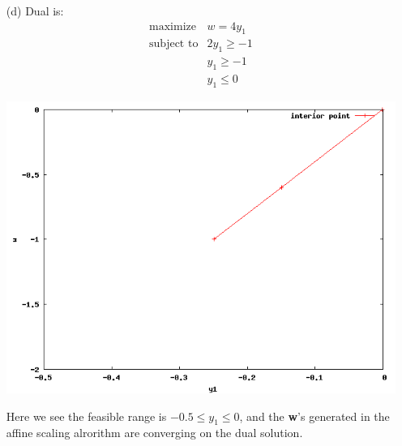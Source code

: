 \documentclass{article}
\begin{document}
\begin{enumerate}
\begin{itemize}
			\item [(d)] Dual is: \\
				\begin{displaymath}
					\begin{array}{ll}
					\textrm{maximize} & w = 4y_1 \\
					\textrm{subject to} & 2y_1 \ge -1 \\
					& y_1 \ge -1 \\
					& y_1 \le 0
					\end{array}
				\end{displaymath}

				\includegraphics[width=0.7\linewidth]{1d.png}

				Here we see the feasible range is $-0.5 \le y_1 \le 0$, and the \textbf{w}'s generated in the affine scaling alrorithm are converging on the dual solution.

		\end{itemize}
\end{enumerate}
\end{document}
